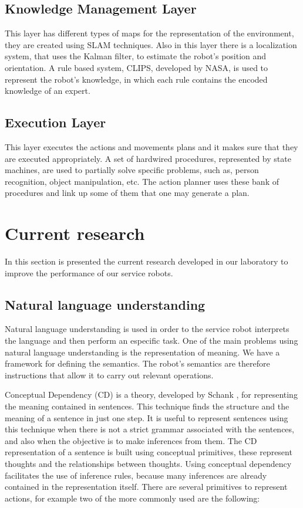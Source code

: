 \documentclass{llncs}
\begin{document}
\subsection{Knowledge Management Layer}

This layer has different types of maps for the representation of the environment, they are created using 
SLAM techniques.
Also in this layer there is a localization system, that uses the Kalman filter, to estimate the robot's position and orientation.
A rule based system, CLIPS, developed by NASA, is used to represent the robot's knowledge, in which each rule contains the encoded knowledge of an expert.


\subsection{Execution Layer}
This layer executes the actions and movements plans and it makes sure that they are executed appropriately.
A set of hardwired procedures, represented by state machines, are used to partially solve specific problems, such as, person recognition, object manipulation, etc. The action planner uses these bank of procedures and link up some of them that one may generate a plan.



\section{Current research}\label{sec:CurrentResearch}
In this section is presented the current research developed in our laboratory to improve the performance of our service robots.

\subsection{Natural language understanding}\label{subsec:NaturalLU}
Natural language understanding is used in order to the service robot interprets the language and then perform an especific task.
One of the main problems using natural language understanding is the representation of meaning.  
We have a framework for defining the semantics. The robot's semantics are therefore instructions that allow it to carry out relevant operations.

Conceptual Dependency (CD) is a theory, developed by Schank \cite{Schank}, for representing the meaning contained in sentences. 
This technique finds the structure and the meaning of a sentence in just one step. 
It is useful to represent sentences using this technique when there is not a strict grammar associated with the sentences, and also when the objective is to make inferences from them.
The CD representation of a sentence is built using conceptual primitives, these represent thoughts and the relationships between thoughts. Using conceptual dependency facilitates the use of inference rules, because many inferences are already contained in the representation itself.
There are several primitives to represent actions, for example two of the more commonly used are the following:
\end{document}
